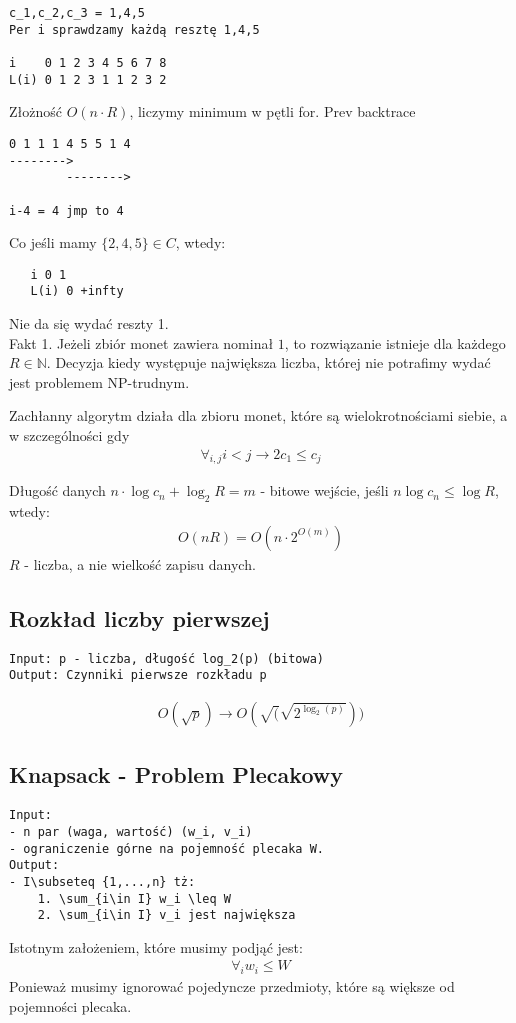 \documentclass{article}
\numberwithin{equation}{subsection}
\begin{document}
\begin{verbatim}
c_1,c_2,c_3 = 1,4,5
Per i sprawdzamy każdą resztę 1,4,5

i    0 1 2 3 4 5 6 7 8
L(i) 0 1 2 3 1 1 2 3 2
\end{verbatim}
Złożność $O(n\cdot R)$, liczymy minimum w pętli for.
Prev backtrace
\begin{verbatim}
0 1 1 1 4 5 5 1 4
-------->
        -------->

i-4 = 4 jmp to 4
\end{verbatim}
Co jeśli mamy $\{2,4,5\}\in C$, wtedy:
\begin{verbatim}
   i 0 1
   L(i) 0 +infty
\end{verbatim}
Nie da się wydać reszty 1.\\
Fakt 1. Jeżeli zbiór monet zawiera nominał $1$, to rozwiązanie istnieje dla każdego $R\in\mathbb{N}$.
Decyzja kiedy występuje największa liczba, której nie potrafimy wydać jest problemem NP-trudnym.

Zachłanny algorytm działa dla zbioru monet, które są wielokrotnościami siebie, a w szczególności gdy
\begin{align}
\forall_{i,j} i<j \rightarrow 2c_1 \leq c_j
\end{align}

Długość danych $n\cdot \log c_n + \log_2 R = m$ - bitowe wejście, jeśli $n\log c_n \leq \log R$, wtedy:
\begin{align}
    O(nR) = O(n\cdot 2^{O(m)})
\end{align}
$R$ - liczba, a nie wielkość zapisu danych.

\subsection{Rozkład liczby pierwszej}
\begin{verbatim}
Input: p - liczba, długość log_2(p) (bitowa)
Output: Czynniki pierwsze rozkładu p
\end{verbatim}
\begin{align}
    O(\sqrt{p}) \rightarrow O(\sqrt(\sqrt{2^{\log_2(p)}})) 
\end{align}

\subsection{Knapsack - Problem Plecakowy}
\begin{verbatim}
Input:
- n par (waga, wartość) (w_i, v_i)
- ograniczenie górne na pojemność plecaka W.
Output:
- I\subseteq {1,...,n} tż:
    1. \sum_{i\in I} w_i \leq W
    2. \sum_{i\in I} v_i jest największa
\end{verbatim}
Istotnym założeniem, które musimy podjąć jest:
\begin{align}
    \forall_i w_i \leq W
\end{align}
Ponieważ musimy ignorować pojedyncze przedmioty, które są większe od pojemności plecaka.\\
\end{document}
